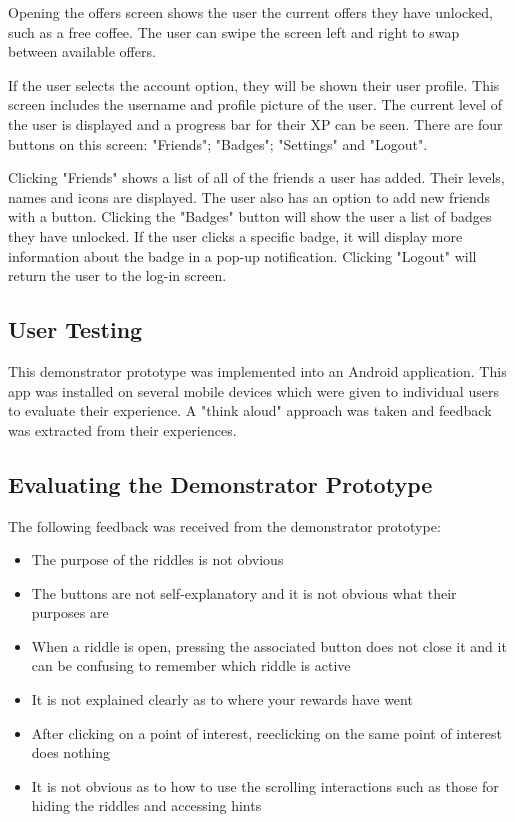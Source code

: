\documentclass[10pt,twocolumn]{article} %
\begin{document}
Opening the offers screen shows the user the current offers they have unlocked, such as a free coffee. The user can swipe the screen left and right to swap between available offers.

If the user selects the account option, they will be shown their user profile. This screen includes the username and profile picture of the user. The current level of the user is displayed and a progress bar for their XP can be seen. There are four buttons on this screen: "Friends"; "Badges"; "Settings" and "Logout".

Clicking "Friends" shows a list of all of the friends a user has added. Their levels, names and icons are displayed. The user also has an option to add new friends with a button. Clicking the "Badges" button will show the user a list of badges they have unlocked. If the user clicks a specific badge, it will display more information about the badge in a pop-up notification. Clicking "Logout" will return the user to the log-in screen.

\subsection*{User Testing}
This demonstrator prototype was implemented into an Android application. This app was installed on several mobile devices which were given to individual users to evaluate their experience. A "think aloud" approach was taken and feedback was extracted from their experiences.

\subsection*{Evaluating the Demonstrator Prototype}
The following feedback was received from the demonstrator prototype:
\begin{itemize}[noitemsep]
 \item The purpose of the riddles is not obvious 
 \item The buttons are not self-explanatory and it is not obvious what their purposes are
 \item When a riddle is open, pressing the associated button does not close it and it can be confusing to remember which riddle is active
 \item It is not explained clearly as to where your rewards have went
 \item After clicking on a point of interest, reeclicking on the same point of interest does nothing
 \item It is not obvious as to how to use the scrolling interactions such as those for hiding the riddles and accessing hints
\end{itemize}
\end{document}
